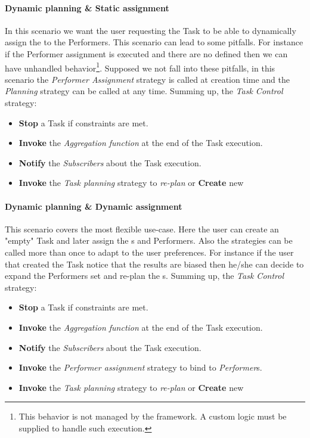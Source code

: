 \paragraph{Dynamic \utask{} planning \& Static assignment}
\label{exec:dynamic-static}
In this scenario we want the user requesting the Task to be able to dynamically
assign the \utask{} to the Performers. This scenario can lead to some pitfalls.
For instance if the Performer assignment is executed and there are no \utask{}
defined then we can have unhandled behavior\footnote{This behavior is not
managed by the framework. A custom logic must be supplied to handle such
execution.}. Supposed we not fall into these pitfalls, in this scenario the
\emph{Performer Assignment} strategy is called at creation time and the
\emph{\utask{} Planning} strategy can be called at any time. Summing up, the
\emph{Task Control} strategy:
\begin{itemize}
	\item \textbf{Stop} a Task if constraints are met.
	\item \textbf{Invoke} the \emph{Aggregation function} at the end of the Task
	execution.
	\item \textbf{Notify} the \emph{Subscribers} about the Task execution.
	\item \textbf{Invoke} the \emph{Task planning} strategy to \emph{re-plan}
	\utask{} or \textbf{Create} new \utask{}
\end{itemize}




\paragraph{Dynamic \utask{} planning \& Dynamic assignment}
\label{exec:dynamic-dynamic}
This scenario covers the most flexible use-case. Here the user can create an
"empty" Task and later assign the \utask{}s and Performers. Also the strategies
can be called more than once to adapt to the user preferences. For instance if
the user that created the Task notice that the results are biased then he/she can
decide to expand the Performers set and re-plan the \utask{}s. Summing up, the
\emph{Task Control} strategy:
\begin{itemize}
	\item \textbf{Stop} a Task if constraints are met.
	\item \textbf{Invoke} the \emph{Aggregation function} at the end of the Task
	execution.
	\item \textbf{Notify} the \emph{Subscribers} about the Task execution.
	\item \textbf{Invoke} the \emph{Performer assignment} strategy to bind \utask{}
	to \emph{Performer}s.
	\item \textbf{Invoke} the \emph{Task planning} strategy to \emph{re-plan}
	\utask{} or \textbf{Create} new \utask{}
\end{itemize}